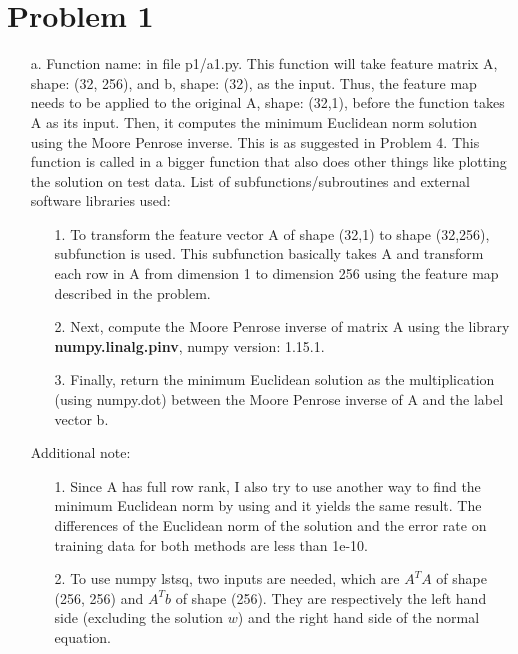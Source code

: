 \documentclass[twoside]{homework}
\begin{document}
\maketitle

\section*{Problem 1}
\begin{itemize}
    \item [a.] Function name:  in file p1/a1.py. This function will take feature matrix A, shape: (32, 256), and b, shape: (32), as the input. Thus, the feature map needs to be applied to the original A, shape: (32,1), before the function takes A as its input. Then, it computes the minimum Euclidean norm solution using the Moore Penrose inverse. This is as suggested in Problem 4. This function is called in a bigger function  that also does other things like plotting the solution on test data.
    \newline\newline
    List of subfunctions/subroutines and external software libraries used:
    \begin{itemize}
        \item [1.] To transform the feature vector A of shape (32,1) to shape (32,256), subfunction  is used. This subfunction basically takes A and transform each row in A from dimension 1 to dimension 256 using the feature map described in the problem.
        \item [2.] Next, compute the Moore Penrose inverse of matrix A using the library \textbf{numpy.linalg.pinv}, numpy version: 1.15.1.
        \item [3.] Finally, return the minimum Euclidean solution as the multiplication (using numpy.dot) between the Moore Penrose inverse of A and the label vector b.
    \end{itemize}
    Additional note:
    \begin{itemize}
        \item [1.] Since A has full row rank, I also try to use another way to find the minimum Euclidean norm by using  and it yields the same result. The differences of the Euclidean norm of the solution and the error rate on training data for both methods are less than 1e-10.
        \item [2.] To use numpy lstsq, two inputs are needed, which are $A^TA$ of shape (256, 256) and $A^Tb$ of shape (256). They are respectively the left hand side (excluding the solution $w$) and the right hand side of the normal equation.

\end{itemize}
\end{itemize}
\end{document}
